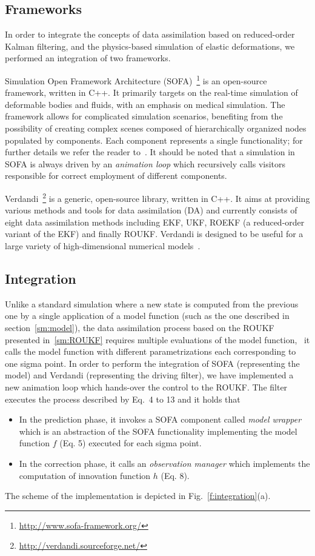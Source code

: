 \subsection{Frameworks}
\label{si:frameworks}
In order to integrate the concepts of data assimilation based on reduced-order Kalman filtering, and the physics-based 
simulation of elastic deformations, we performed an integration of two frameworks. 

Simulation Open Framework Architecture (SOFA)~\footnote{\url{http://www.sofa-framework.org/}} is an open-source framework, written in C++. 
It primarily targets on the real-time simulation of deformable bodies and fluids, with an emphasis on medical simulation.
The framework allows for complicated simulation scenarios, benefiting from the possibility of creating complex 
scenes composed of hierarchically organized nodes populated by components. Each component represents a single functionality; for further details 
we refer the reader to~\cite{faure2012sofa}. It should be noted that a simulation in SOFA is always driven by an \emph{animation loop} 
which recursively calls visitors responsible for correct employment of different components. 

Verdandi~\footnote{\url{http://verdandi.sourceforge.net/}} is a generic, open-source library, written in C++. 
It aims at providing various methods and tools for data assimilation (DA) and currently consists of eight data assimilation methods
including EKF, UKF, ROEKF (a reduced-order variant of the EKF) and finally ROUKF. 
Verdandi is designed to be useful for a large variety of high-dimensional numerical models~\cite{chabiniok2012}. 

\subsection{Integration}
\label{si:integration}
Unlike a standard simulation where a new state is computed from the previous one by a single application of a model function (such as the one described in 
section~\ref{sm:model}), the data assimilation process based on the ROUKF presented in~\ref{sm:ROUKF} requires multiple evaluations 
of the model function, \ie\ it calls the model function with different parametrizations each corresponding to 
one sigma point. In order to perform the integration of SOFA (representing the model) and Verdandi (representing the driving filter), 
we have implemented a new animation loop which hands-over the control to the ROUKF. 
The filter executes the process described by Eq.~4 to 13 and it holds that
\begin{itemize}
\item In the prediction phase, it invokes a SOFA component called \emph{model wrapper} which is an abstraction of the SOFA functionality implementing the model function $f$ (Eq. 5) executed for each sigma point.
\item In the correction phase, it calls an \emph{observation manager} which implements the computation of innovation function $h$ (Eq. 8).
\end{itemize}
The scheme of the implementation is depicted in Fig.~\ref{f:integration}(a). 

